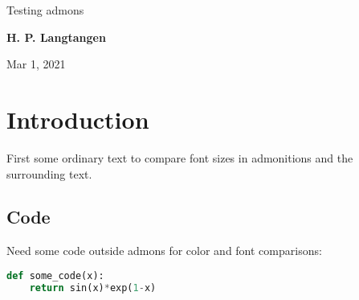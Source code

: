 \documentclass[%
oneside,                 %
final,                   %
10pt]{article}
\begin{document}

\newcommand{\exercisesection}[1]{\subsection*{#1}}








\thispagestyle{empty}

\begin{center}
{\LARGE\bf
\begin{spacing}{1.25}
Testing admons
\end{spacing}
}
\end{center}


\begin{center}
{\bf H. P. Langtangen${}^{}$} \\ [0mm]
\end{center}

\begin{center}
\end{center}
    

\begin{center}
Mar 1, 2021
\end{center}

\vspace{1cm}


\section{Introduction}
First some ordinary text to compare font sizes in admonitions
and the surrounding text.

\subsection{Code}

Need some code outside admons for color and font comparisons:

\begin{lstlisting}[language=Python,style=simple,xleftmargin=2mm]
def some_code(x):
    return sin(x)*exp(1-x)
\end{lstlisting}
\end{document}
